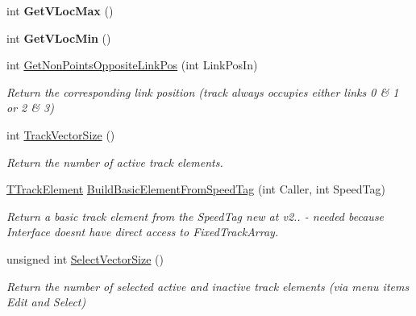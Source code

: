 \begin{DoxyCompactItemize}
\mbox{\label{class_t_track_a5c13595c171f5c7e4aaa6dfc18f4359f}} 
int {\bfseries Get\+V\+Loc\+Max} ()
\item 
\mbox{\label{class_t_track_ac42bd1e1e148a91396310b1077d2d8e0}} 
int {\bfseries Get\+V\+Loc\+Min} ()
\item 
\mbox{\label{class_t_track_aeb515d40cb9b08ed55ce877ffdbc51a5}} 
int \mbox{\hyperlink{class_t_track_aeb515d40cb9b08ed55ce877ffdbc51a5}{Get\+Non\+Points\+Opposite\+Link\+Pos}} (int Link\+Pos\+In)
\begin{DoxyCompactList}\small\item\em Return the corresponding link position (track always occupies either links 0 \& 1 or 2 \& 3) \end{DoxyCompactList}\item 
\mbox{\label{class_t_track_a55d9415e3ecac804f3345dddd74f9bad}} 
int \mbox{\hyperlink{class_t_track_a55d9415e3ecac804f3345dddd74f9bad}{Track\+Vector\+Size}} ()
\begin{DoxyCompactList}\small\item\em Return the number of active track elements. \end{DoxyCompactList}\item 
\mbox{\label{class_t_track_af507e9106aa12a670d6b09bd575cbfc3}} 
\mbox{\hyperlink{class_t_track_element}{T\+Track\+Element}} \mbox{\hyperlink{class_t_track_af507e9106aa12a670d6b09bd575cbfc3}{Build\+Basic\+Element\+From\+Speed\+Tag}} (int Caller, int Speed\+Tag)
\begin{DoxyCompactList}\small\item\em Return a basic track element from the Speed\+Tag new at v2.. -\/ needed because Interface doesn\textquotesingle{}t have direct access to Fixed\+Track\+Array. \end{DoxyCompactList}\item 
\mbox{\label{class_t_track_a3cae8cc2dc72d74cf0d24dbc4148c591}} 
unsigned int \mbox{\hyperlink{class_t_track_a3cae8cc2dc72d74cf0d24dbc4148c591}{Select\+Vector\+Size}} ()
\begin{DoxyCompactList}\small\item\em Return the number of selected active and inactive track elements (via menu items \textquotesingle{}Edit\textquotesingle{} and \textquotesingle{}Select\textquotesingle{}) \end{DoxyCompactList}\item 

\end{DoxyCompactItemize}
